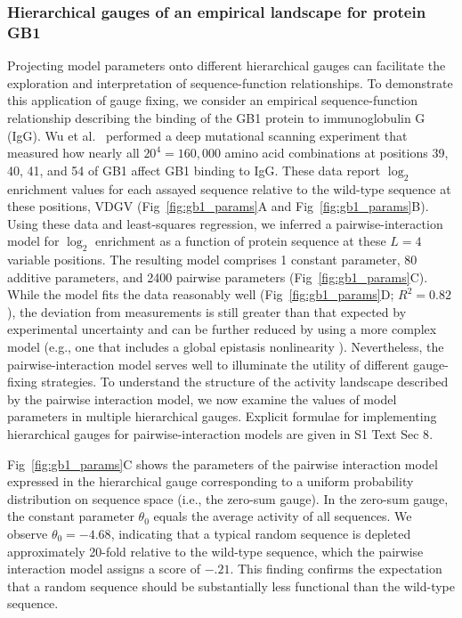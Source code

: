 \documentclass[10pt,letterpaper]{article}
\newcommand{\fig}[2]{Fig\ \ref{#1}#2}
\newcommand{\si}[1]{{S1 Text Sec #1}}
\begin{document}
\subsubsection*{Hierarchical gauges of an empirical landscape for protein GB1}

Projecting model parameters onto different hierarchical gauges can facilitate the exploration and interpretation of sequence-function relationships.  To demonstrate this application of gauge fixing, we consider an empirical sequence-function relationship describing the binding of the GB1 protein to immunoglobulin G (IgG). Wu et al.\ \cite{Wu:2016kp} performed a deep mutational scanning experiment that measured how nearly all $20^4 = 160,000$ amino acid combinations at positions 39, 40, 41, and 54 of GB1 affect GB1 binding to IgG. These data report $\log_2$ enrichment values for each assayed sequence relative to the wild-type sequence at these positions, VDGV (\fig{fig:gb1_params}A and \fig{fig:gb1_params}B). Using these data and least-squares regression, we inferred a pairwise-interaction model for $\log_2$ enrichment as a function of protein sequence at these $L=4$ variable positions. The resulting model comprises 1 constant parameter, 80 additive parameters, and 2400 pairwise parameters (\fig{fig:gb1_params}C). While the model fits the data reasonably well (\fig{fig:gb1_params}D; $R^2 = 0.82$), the deviation from measurements is still greater than that expected by experimental uncertainty and can be further reduced by using a more complex model (e.g., one that includes a global epistasis nonlinearity \cite{Otwinowski:2018jj,Tareen:2022dh}). Nevertheless, the pairwise-interaction model serves well to illuminate the utility of different gauge-fixing strategies. To understand the structure of the activity landscape described by the pairwise interaction model, we now examine the values of model parameters in multiple hierarchical gauges. Explicit formulae for implementing hierarchical gauges for pairwise-interaction models are given in \si{8}.

\fig{fig:gb1_params}C shows the parameters of the pairwise interaction model expressed in the hierarchical gauge corresponding to a uniform probability distribution on sequence space (i.e., the zero-sum gauge). In the zero-sum gauge, the constant parameter $\theta_0$ equals the average activity of all sequences. We observe $\theta_0=-4.68$, indicating that a typical random sequence is depleted approximately 20-fold relative to the wild-type sequence, which the pairwise interaction model assigns a score of $-.21$. This finding confirms the expectation that a random sequence should be substantially less functional than the wild-type sequence. 
\end{document}
